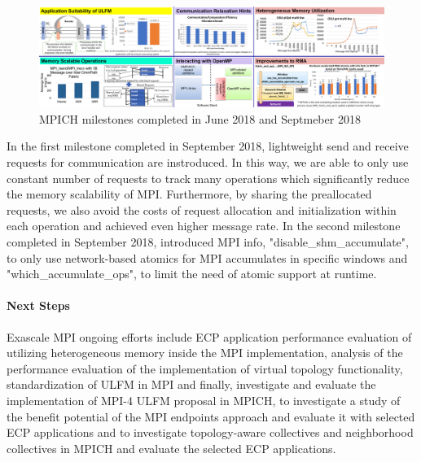 \begin{figure}[htb]
  \centering
  \includegraphics[width=6in]{projects/2.3.1-PMR/2.3.1.07-Exascale-MPI/MPICH-recent-milestones.pdf}
  \caption{\label{fig:sep18}MPICH milestones
    completed in June 2018 and Septmeber 2018}
\end{figure}

In the first milestone completed in September 2018, lightweight send and receive requests
for communication are instroduced. In this
way, we are able to only use constant number of requests to track many operations which
significantly reduce the memory scalability
of MPI. Furthermore, by sharing the preallocated requests, we also avoid the costs
of request allocation and initialization within each operation and achieved even higher message rate.
In the second milestone completed in September 2018, introduced MPI info, "disable\_shm\_accumulate",
to only use network-based atomics for MPI accumulates in specific windows and
"which\_accumulate\_ops", to limit the need of atomic support at runtime.

\paragraph{Next Steps}
Exascale MPI ongoing efforts include ECP application performance evaluation of utilizing
heterogeneous memory inside the MPI implementation, analysis of the performance evaluation
of the implementation of virtual topology functionality, standardization of ULFM
in MPI and finally, investigate and evaluate the implementation of MPI-4 ULFM proposal in MPICH,
to investigate a study of the benefit potential of the MPI endpoints approach and evaluate
it with selected ECP applications and to investigate
topology-aware collectives and neighborhood collectives in MPICH and evaluate the selected ECP applications.
